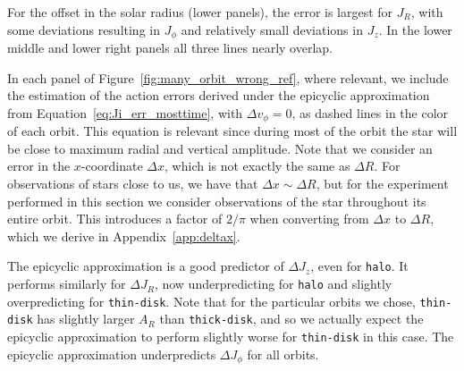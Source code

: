 \documentclass[twocolumn]{aastex62}
\newcommand{\thin}{\texttt{thin-disk}}
\newcommand{\thick}{\texttt{thick-disk}}
\newcommand{\halo}{\texttt{halo}}
\begin{document}
For the offset in the solar radius (lower panels), the error is largest for
$J_R$, with some deviations resulting in $J_{\phi}$ and relatively small
deviations in $J_z$. In the lower middle and lower right panels all three
lines nearly overlap.

In each panel of Figure~\ref{fig:many_orbit_wrong_ref}, where relevant, we
include the estimation of the action errors derived under the epicyclic
approximation from Equation~\eqref{eq:Ji_err_mosttime}, with $\Delta
v_{\phi}=0$, as dashed lines in the color of each orbit. This equation is
relevant since during most of the orbit the star will be close to 
maximum radial and
vertical amplitude. Note that we
consider an error in the $x$-coordinate $\Delta x$, which is not exactly the
same as $\Delta R$. For observations of stars close to us, we have that
$\Delta x \sim \Delta R$, but for the experiment performed in this section we
consider observations of the star throughout its entire orbit. This introduces
a factor of $2/\pi$ when converting from $\Delta x$ to $\Delta R$, which we
derive in Appendix~\ref{app:deltax}.

The epicyclic approximation is a good predictor of $\Delta J_z$, even for \halo{}.
It performs similarly for $\Delta J_R$, now underpredicting for \halo{}
and slightly overpredicting for \thin{}. Note that for the
particular orbits we chose, \thin{} has slightly larger $A_R$ than
\thick{}, and so we actually expect the epicyclic approximation to perform
slightly worse for \thin{} in this case. The epicyclic approximation underpredicts $\Delta J_{\phi}$
for all orbits.
\end{document}
